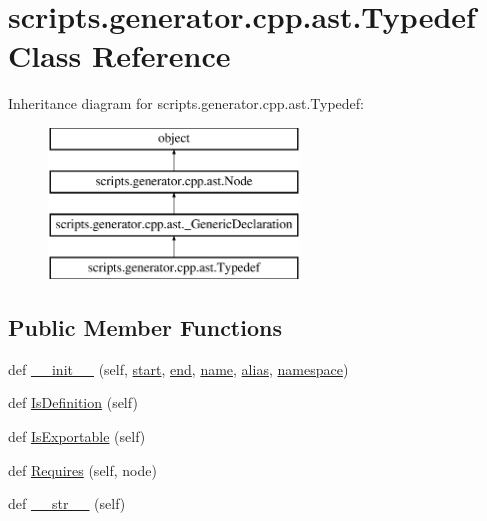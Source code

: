 \hypertarget{classscripts_1_1generator_1_1cpp_1_1ast_1_1_typedef}{}\section{scripts.\+generator.\+cpp.\+ast.\+Typedef Class Reference}
\label{classscripts_1_1generator_1_1cpp_1_1ast_1_1_typedef}
Inheritance diagram for scripts.\+generator.\+cpp.\+ast.\+Typedef\+:\begin{figure}[H]
\begin{center}
\leavevmode
\includegraphics[height=4.000000cm]{d9/d70/classscripts_1_1generator_1_1cpp_1_1ast_1_1_typedef}
\end{center}
\end{figure}
\subsection*{Public Member Functions}
\begin{DoxyCompactItemize}
\item 
def \mbox{\hyperlink{classscripts_1_1generator_1_1cpp_1_1ast_1_1_typedef_a0cfe40364d920440b18d1a6fb50485f1}{\+\_\+\+\_\+init\+\_\+\+\_\+}} (self, \mbox{\hyperlink{classscripts_1_1generator_1_1cpp_1_1ast_1_1_node_a27ce0a583baee598b75ac6dd21f8575b}{start}}, \mbox{\hyperlink{classscripts_1_1generator_1_1cpp_1_1ast_1_1_node_a8e3394f9dd405352610ff9be4f284e2c}{end}}, \mbox{\hyperlink{classscripts_1_1generator_1_1cpp_1_1ast_1_1___generic_declaration_a7cc4e9a1dace9c627d7fe4ce614a8888}{name}}, \mbox{\hyperlink{classscripts_1_1generator_1_1cpp_1_1ast_1_1_typedef_afbfe7d8c4728de7d8d28ef31dcbcbed3}{alias}}, \mbox{\hyperlink{classscripts_1_1generator_1_1cpp_1_1ast_1_1___generic_declaration_a6e7fb8f951551af19f2366876a150817}{namespace}})
\item 
def \mbox{\hyperlink{classscripts_1_1generator_1_1cpp_1_1ast_1_1_typedef_abec1cdfde25bcb813031bb1a44505851}{Is\+Definition}} (self)
\item 
def \mbox{\hyperlink{classscripts_1_1generator_1_1cpp_1_1ast_1_1_typedef_a6912028a648a58d9167be022b7c48874}{Is\+Exportable}} (self)
\item 
def \mbox{\hyperlink{classscripts_1_1generator_1_1cpp_1_1ast_1_1_typedef_a1a243bef75ae51119bd84d6304860c48}{Requires}} (self, node)
\item 
def \mbox{\hyperlink{classscripts_1_1generator_1_1cpp_1_1ast_1_1_typedef_af9fcb3f3950387be184219b6fdd40939}{\+\_\+\+\_\+str\+\_\+\+\_\+}} (self)
\end{DoxyCompactItemize}
